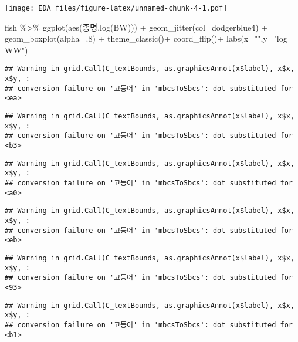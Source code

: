 \documentclass[
]{article}
\newenvironment{Shaded}{\begin{snugshade}}{\end{snugshade}}
\newcommand{\AttributeTok}[1]{\textcolor[rgb]{0.77,0.63,0.00}{#1}}
\newcommand{\DecValTok}[1]{\textcolor[rgb]{0.00,0.00,0.81}{#1}}
\newcommand{\FunctionTok}[1]{\textcolor[rgb]{0.00,0.00,0.00}{#1}}
\newcommand{\NormalTok}[1]{#1}
\newcommand{\SpecialCharTok}[1]{\textcolor[rgb]{0.00,0.00,0.00}{#1}}
\newcommand{\StringTok}[1]{\textcolor[rgb]{0.31,0.60,0.02}{#1}}
\begin{document}
\texttt{[image: EDA\_files/figure-latex/unnamed-chunk-4-1.pdf]}

\begin{Shaded}
\begin{Highlighting}[]
\NormalTok{fish }\SpecialCharTok{\%\textgreater{}\%} \FunctionTok{ggplot}\NormalTok{(}\FunctionTok{aes}\NormalTok{(종명,}\FunctionTok{log}\NormalTok{(BW))) }\SpecialCharTok{+} \FunctionTok{geom\_jitter}\NormalTok{(}\AttributeTok{col=}\StringTok{\textquotesingle{}dodgerblue4\textquotesingle{}}\NormalTok{) }\SpecialCharTok{+} \FunctionTok{geom\_boxplot}\NormalTok{(}\AttributeTok{alpha=}\NormalTok{.}\DecValTok{8}\NormalTok{) }\SpecialCharTok{+} \FunctionTok{theme\_classic}\NormalTok{()}\SpecialCharTok{+} \FunctionTok{coord\_flip}\NormalTok{()}\SpecialCharTok{+} \FunctionTok{labs}\NormalTok{(}\AttributeTok{x=}\StringTok{""}\NormalTok{,}\AttributeTok{y=}\StringTok{"log WW"}\NormalTok{)}
\end{Highlighting}
\end{Shaded}

\begin{verbatim}
## Warning in grid.Call(C_textBounds, as.graphicsAnnot(x$label), x$x, x$y, :
## conversion failure on '고등어' in 'mbcsToSbcs': dot substituted for <ea>
\end{verbatim}

\begin{verbatim}
## Warning in grid.Call(C_textBounds, as.graphicsAnnot(x$label), x$x, x$y, :
## conversion failure on '고등어' in 'mbcsToSbcs': dot substituted for <b3>
\end{verbatim}

\begin{verbatim}
## Warning in grid.Call(C_textBounds, as.graphicsAnnot(x$label), x$x, x$y, :
## conversion failure on '고등어' in 'mbcsToSbcs': dot substituted for <a0>
\end{verbatim}

\begin{verbatim}
## Warning in grid.Call(C_textBounds, as.graphicsAnnot(x$label), x$x, x$y, :
## conversion failure on '고등어' in 'mbcsToSbcs': dot substituted for <eb>
\end{verbatim}

\begin{verbatim}
## Warning in grid.Call(C_textBounds, as.graphicsAnnot(x$label), x$x, x$y, :
## conversion failure on '고등어' in 'mbcsToSbcs': dot substituted for <93>
\end{verbatim}

\begin{verbatim}
## Warning in grid.Call(C_textBounds, as.graphicsAnnot(x$label), x$x, x$y, :
## conversion failure on '고등어' in 'mbcsToSbcs': dot substituted for <b1>
\end{verbatim}
\end{document}

